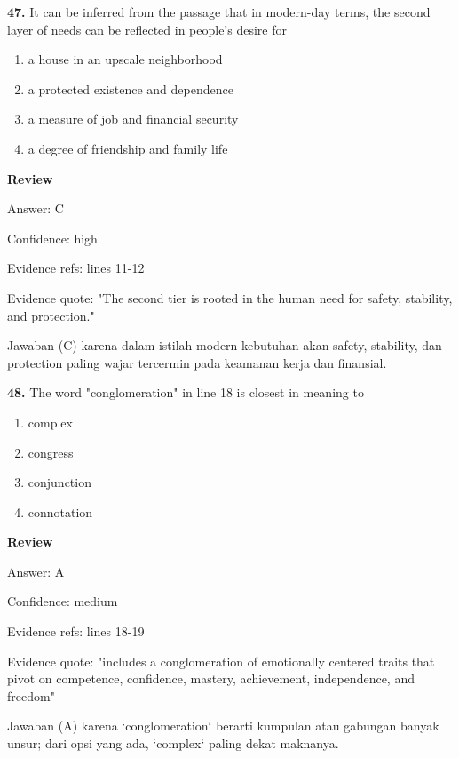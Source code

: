 \documentclass[12pt]{article}
\begin{document}
\noindent\textbf{47.} It can be inferred from the passage that in modern-day terms, the second layer of needs can be reflected in people's desire for
\begin{enumerate}[label=(\Alph*),leftmargin=*,itemsep=0.2em]
\item a house in an upscale neighborhood
\item a protected existence and dependence
\item a measure of job and financial security
\item a degree of friendship and family life
\end{enumerate}
\par
\begingroup
\setlength{\parskip}{0pt}
\setlength{\parindent}{0pt}
\textbf{Review}\par
Answer: C\par
Confidence: high\par
Evidence refs: lines 11-12\par
Evidence quote: "The second tier is rooted in the human need for safety, stability, and protection."\par
Jawaban (C) karena dalam istilah modern kebutuhan akan safety, stability, dan protection paling wajar tercermin pada keamanan kerja dan finansial.\par
\endgroup
\par
\vspace{0.25\baselineskip}
\noindent\textbf{48.} The word "conglomeration" in line 18 is closest in meaning to
\begin{enumerate}[label=(\Alph*),leftmargin=*,itemsep=0.2em]
\item complex
\item congress
\item conjunction
\item connotation
\end{enumerate}
\par
\begingroup
\setlength{\parskip}{0pt}
\setlength{\parindent}{0pt}
\textbf{Review}\par
Answer: A\par
Confidence: medium\par
Evidence refs: lines 18-19\par
Evidence quote: "includes a conglomeration of emotionally centered traits that pivot on competence, confidence, mastery, achievement, independence, and freedom"\par
Jawaban (A) karena `conglomeration` berarti kumpulan atau gabungan banyak unsur; dari opsi yang ada, `complex` paling dekat maknanya.\par
\end{document}
